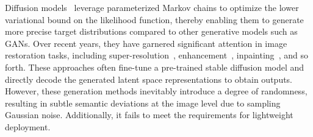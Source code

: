 Diffusion models~\cite{ho2020denoising,song2020denoising,kawar2022denoising} leverage parameterized Markov chains to optimize the lower variational bound on the likelihood function, thereby enabling them to generate more precise target distributions compared to other generative models such as GANs. Over recent years, they have garnered significant attention in image restoration tasks, including super-resolution~\cite{li2022srdiff,lin2023diffbir}, enhancement~\cite{wang2024zero}, inpainting~\cite{xia2023diffir}, and so forth. 
These approaches often fine-tune a pre-trained stable diffusion model and directly decode the generated latent space representations to obtain outputs. However, these generation methods inevitably introduce a degree of randomness, resulting in subtle semantic deviations at the image level due to sampling Gaussian noise. Additionally, it fails to meet the requirements for lightweight deployment.
